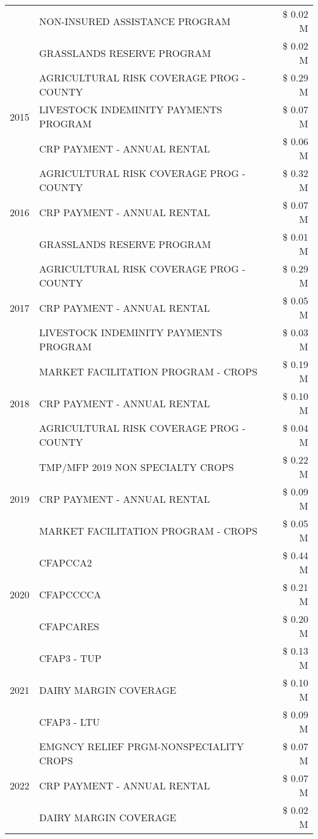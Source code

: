 \begin{tabular}{llr}
 & NON-INSURED ASSISTANCE PROGRAM & \$ 0.02 M \\
 & GRASSLANDS RESERVE PROGRAM & \$ 0.02 M \\
\cline{1-3}
\multirow[t]{3}{*}{2015} & AGRICULTURAL RISK COVERAGE PROG - COUNTY & \$ 0.29 M \\
 & LIVESTOCK INDEMINITY PAYMENTS PROGRAM & \$ 0.07 M \\
 & CRP PAYMENT - ANNUAL RENTAL & \$ 0.06 M \\
\cline{1-3}
\multirow[t]{3}{*}{2016} & AGRICULTURAL RISK COVERAGE PROG - COUNTY & \$ 0.32 M \\
 & CRP PAYMENT - ANNUAL RENTAL & \$ 0.07 M \\
 & GRASSLANDS RESERVE PROGRAM & \$ 0.01 M \\
\cline{1-3}
\multirow[t]{3}{*}{2017} & AGRICULTURAL RISK COVERAGE PROG - COUNTY & \$ 0.29 M \\
 & CRP PAYMENT - ANNUAL RENTAL & \$ 0.05 M \\
 & LIVESTOCK INDEMINITY PAYMENTS PROGRAM & \$ 0.03 M \\
\cline{1-3}
\multirow[t]{3}{*}{2018} & MARKET FACILITATION PROGRAM - CROPS & \$ 0.19 M \\
 & CRP PAYMENT - ANNUAL RENTAL & \$ 0.10 M \\
 & AGRICULTURAL RISK COVERAGE PROG - COUNTY & \$ 0.04 M \\
\cline{1-3}
\multirow[t]{3}{*}{2019} & TMP/MFP 2019 NON SPECIALTY CROPS & \$ 0.22 M \\
 & CRP PAYMENT - ANNUAL RENTAL & \$ 0.09 M \\
 & MARKET FACILITATION PROGRAM - CROPS & \$ 0.05 M \\
\cline{1-3}
\multirow[t]{3}{*}{2020} & CFAPCCA2 & \$ 0.44 M \\
 & CFAPCCCCA & \$ 0.21 M \\
 & CFAPCARES & \$ 0.20 M \\
\cline{1-3}
\multirow[t]{3}{*}{2021} & CFAP3 - TUP & \$ 0.13 M \\
 & DAIRY MARGIN COVERAGE & \$ 0.10 M \\
 & CFAP3 - LTU & \$ 0.09 M \\
\cline{1-3}
\multirow[t]{3}{*}{2022} & EMGNCY RELIEF PRGM-NONSPECIALITY CROPS & \$ 0.07 M \\
 & CRP PAYMENT - ANNUAL RENTAL & \$ 0.07 M \\
 & DAIRY MARGIN COVERAGE & \$ 0.02 M \\
\cline{1-3}
\bottomrule
\end{tabular}

